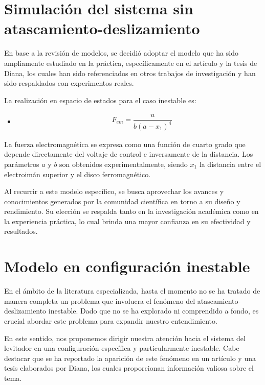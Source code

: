 \section{Simulación del sistema sin atascamiento-deslizamiento}

En base a la revisión de modelos, se decidió adoptar el modelo que ha sido ampliamente estudiado en la práctica, específicamente en el artículo y la tesis de Diana, los cuales han sido referenciados en otros trabajos de investigación y han sido respaldados con experimentos reales.

La realización en espacio de estados para el caso inestable es:

\begin{itemize}[label={}]
    \item{ 
    \begin{align*}
        &F_{em}= \dfrac{u}{b(a-x_{1})^4} 
    \end{align*}

    }   
\end{itemize}
La fuerza electromagnética se expresa como una función de cuarto grado que depende directamente del voltaje de control e inversamente de la distancia. Los parámetros $a$ y $b$ son obtenidos experimentalmente, siendo $x_{1}$ la distancia entre el electroimán superior y el disco ferromagnético.\cite{maaz}\cite{naz}

Al recurrir a este modelo específico, se busca aprovechar los avances y conocimientos generados por la comunidad científica en torno a su diseño y rendimiento. Su elección se respalda tanto en la investigación académica como en la experiencia práctica, lo cual brinda una mayor confianza en su efectividad y resultados.

\section{Modelo en configuración inestable}

En el ámbito de la literatura especializada, hasta el momento no se ha tratado de manera completa un problema que involucra el fenómeno del atascamiento-deslizamiento inestable. Dado que no se ha explorado ni comprendido a fondo, es crucial abordar este problema para expandir nuestro entendimiento.

En este sentido, nos proponemos dirigir nuestra atención hacia el sistema del levitador en una configuración específica y particularmente inestable. Cabe destacar que se ha reportado la aparición de este fenómeno en un artículo y una tesis elaborados por Diana, los cuales proporcionan información valiosa sobre el tema.


